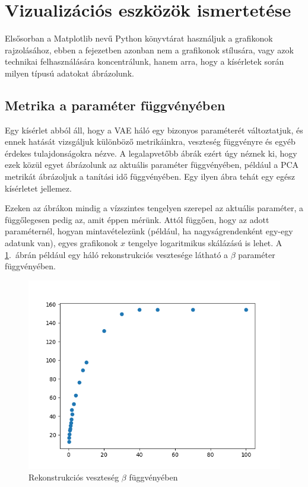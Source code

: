 \section{Vizualizációs eszközök ismertetése}

Elsősorban a Matplotlib nevű Python könyvtárat használjuk a grafikonok rajzolásához, ebben a fejezetben azonban nem a grafikonok stílusára, vagy azok technikai felhasználására koncentrálunk, hanem arra, hogy a kísérletek során milyen típusú adatokat ábrázolunk.

\subsection{Metrika a paraméter függvényében}

Egy kísérlet abból áll, hogy a VAE háló egy bizonyos paraméterét változtatjuk, és ennek hatását vizsgáljuk különböző metrikáinkra, veszteség függvényre és egyéb érdekes tulajdonságokra nézve. A legalapvetőbb ábrák ezért úgy néznek ki, hogy ezek közül egyet ábrázolunk az aktuális paraméter függvényében, például a PCA metrikát ábrázoljuk a tanítási idő függvényében. Egy ilyen ábra tehát egy egész kísérletet jellemez.

Ezeken az ábrákon mindig a vízszintes tengelyen szerepel az aktuális paraméter, a függőlegesen pedig az, amit éppen mérünk. Attól függően, hogy az adott paraméternél, hogyan mintavételezünk (például, ha nagyságrendenként egy-egy adatunk van), egyes grafikonok $x$ tengelye logaritmikus skálázású is lehet. A \ref{mgraph}.~ábrán például egy háló rekonstrukciós vesztesége látható a $\beta$ paraméter függvényében.

\begin{figure}[h!]
\begin{center}
 
  
	\begin{center}
	\includegraphics[width=0.75\linewidth]{vae_beta-loss.png}
	\end{center}
	
  \caption{Rekonstrukciós veszteség $\beta$ függvényében} \label{mgraph}
\end{center}
\end{figure}


